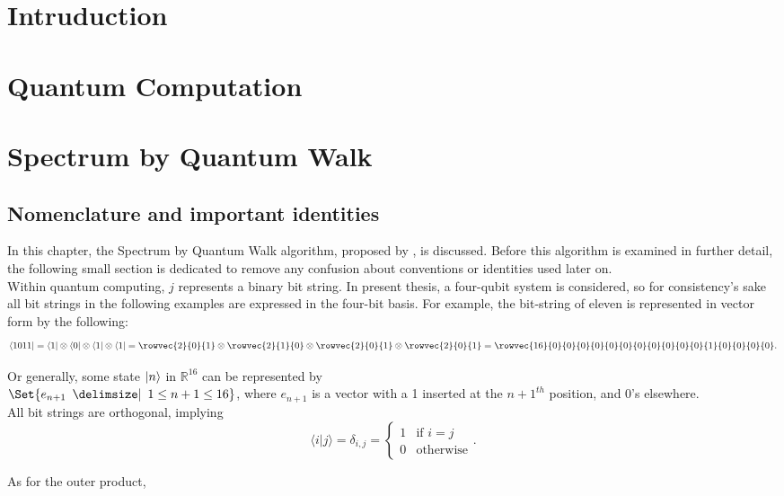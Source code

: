 \documentclass{article}
\def\bracket#1#2{\langle #1 | #2 \rangle}
\providecommand\given{}
\newcommand\SetSymbol[1][]{%
  \nonscript\:#1\vert
  \allowbreak
  \nonscript\:
  \mathopen{}}
\renewcommand\given{\;\SetSymbol[\delimsize]\;}
\begin{document}
\abstract{}

\section{Intruduction}

\section{Quantum Computation}

\section{Spectrum by Quantum Walk}

\subsection{Nomenclature and important identities}

In this chapter, the Spectrum by Quantum Walk algorithm, proposed by \textcite{poulin}, is discussed. Before this algorithm is examined in further detail, the following small section is dedicated to remove any confusion about conventions or identities used later on. \\
Within quantum computing, $j$ represents a binary bit string. In present thesis, a four-qubit system is considered, so for consistency's sake all bit strings in the following examples are expressed in the four-bit basis.
For example, the bit-string of eleven is represented in vector form by the following:
$$  \bra{1011} = \bra{1} \otimes \bra{0} \otimes \bra{1} \otimes \bra{1} = \rowvec{2}{0}{1} \otimes \rowvec{2}{1}{0} \otimes \rowvec{2}{0}{1} \otimes \rowvec{2}{0}{1} =   \rowvec{16}{0}{0}{0}{0}{0}{0}{0}{0}{0}{0}{0}{1}{0}{0}{0}{0}.$$

Or generally, some state $\left\vert{n}\right\rangle$ in $\mathbb{R}^{16}$  can be represented by  \\ $\Set{e_{n+1} \given 1 \leq n + 1 \leq 16}$, where $e_{n+1}$ is a vector with a 1 inserted at the $n+1^{th}$ position, and 0's elsewhere. \\

All bit strings are orthogonal, implying $$\bracket i j = \delta_{i,j} = \begin{cases}
1& \text{if } i = j\\
    0              & \text{otherwise}
\end{cases}.
$$

As for the outer product,
\end{document}
